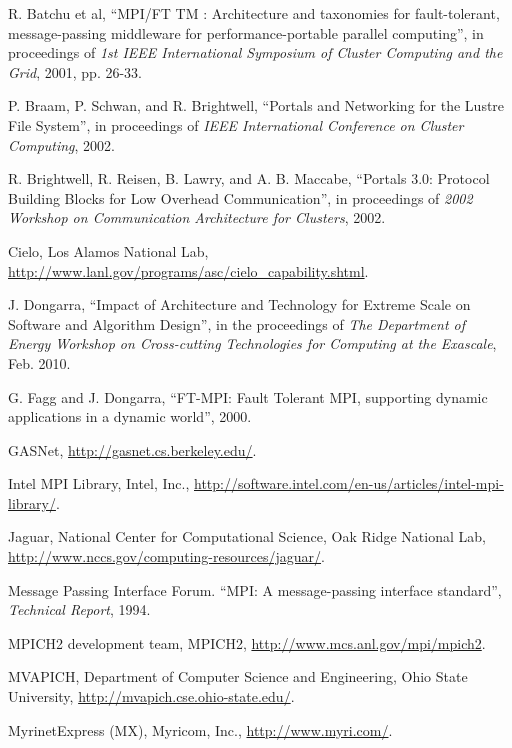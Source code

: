 \documentclass[conference]{IEEEtran}
\begin{document}
\begin{thebibliography}{30}

R. Batchu et al, ``MPI/FT TM : Architecture and taxonomies for fault-tolerant,
message-passing middleware for performance-portable parallel computing'', in proceedings
of \emph{1st IEEE International Symposium of Cluster Computing and the Grid}, 2001, pp.
26-33.

P. Braam, P. Schwan, and R. Brightwell, ``Portals and Networking for the Lustre File
System'', in proceedings of \emph{IEEE International Conference on Cluster Computing},
2002.

R. Brightwell, R. Reisen, B. Lawry, and A. B. Maccabe, ``Portals 3.0: Protocol Building
Blocks for Low Overhead Communication'', in proceedings of \emph{2002 Workshop on
Communication Architecture for Clusters}, 2002.

Cielo, Los Alamos National Lab, \url{http://www.lanl.gov/programs/asc/cielo_capability.shtml}.

J. Dongarra, ``Impact of Architecture and Technology for Extreme Scale on Software
and Algorithm Design'', in the proceedings of \emph{The Department of Energy Workshop on
Cross-cutting Technologies for Computing at the Exascale}, Feb. 2010.

G. Fagg and J. Dongarra, ``FT-MPI: Fault Tolerant MPI, supporting dynamic applications in
a dynamic world'', 2000.

GASNet, \url{http://gasnet.cs.berkeley.edu/}.

Intel MPI Library, Intel, Inc.,
\url{http://software.intel.com/en-us/articles/intel-mpi-library/}.

Jaguar, National Center for Computational Science, Oak Ridge National Lab,
\url{http://www.nccs.gov/computing-resources/jaguar/}.

Message Passing Interface Forum. ``MPI: A message-passing interface standard'',
\emph{Technical Report}, 1994.

MPICH2 development team, MPICH2, \url{http://www.mcs.anl.gov/mpi/mpich2}.

MVAPICH, Department of Computer Science and Engineering, Ohio State University,
\url{http://mvapich.cse.ohio-state.edu/}.

MyrinetExpress (MX), Myricom, Inc., \url{http://www.myri.com/}.


\end{thebibliography}
\end{document}
